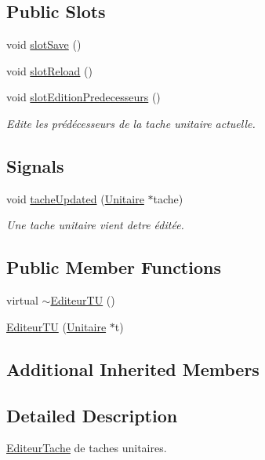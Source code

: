 \subsection*{Public Slots}
\begin{DoxyCompactItemize}
\item 
void \hyperlink{class_editeur_t_u_a984d437115865a68627399a46044498b}{slot\+Save} ()
\item 
void \hyperlink{class_editeur_t_u_a13ca89536b3639d1a4e02b344dc94bac}{slot\+Reload} ()
\item 
void \hyperlink{class_editeur_t_u_a3d2a510d3b85a8c4faa6138a3652bedf}{slot\+Edition\+Predecesseurs} ()
\begin{DoxyCompactList}\small\item\em Edite les prédécesseurs de la tache unitaire actuelle. \end{DoxyCompactList}\end{DoxyCompactItemize}
\subsection*{Signals}
\begin{DoxyCompactItemize}
\item 
void \hyperlink{class_editeur_t_u_a274d794e10771caa0ae7f0078ef7123a}{tache\+Updated} (\hyperlink{class_unitaire}{Unitaire} $\ast$tache)
\begin{DoxyCompactList}\small\item\em Une tache unitaire vient d\textquotesingle{}etre éditée. \end{DoxyCompactList}\end{DoxyCompactItemize}
\subsection*{Public Member Functions}
\begin{DoxyCompactItemize}
\item 
virtual \hyperlink{class_editeur_t_u_a211cf15b8ca469ebc116e65047d520d7}{$\sim$\+Editeur\+T\+U} ()
\item 
\hyperlink{class_editeur_t_u_ae4ba80d6b96a46a51b2549e607cde008}{Editeur\+T\+U} (\hyperlink{class_unitaire}{Unitaire} $\ast$t)
\end{DoxyCompactItemize}
\subsection*{Additional Inherited Members}


\subsection{Detailed Description}
\hyperlink{class_editeur_tache}{Editeur\+Tache} de taches unitaires. 


